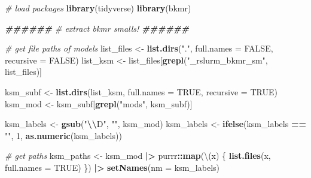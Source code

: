 \documentclass[12pt, twoside]{amherstthesis}
\newenvironment{Shaded}{\begin{snugshade}}{\end{snugshade}}
\newcommand{\AttributeTok}[1]{\textcolor[rgb]{0.13,0.29,0.53}{#1}}
\newcommand{\CommentTok}[1]{\textcolor[rgb]{0.56,0.35,0.01}{\textit{#1}}}
\newcommand{\ConstantTok}[1]{\textcolor[rgb]{0.56,0.35,0.01}{#1}}
\newcommand{\DecValTok}[1]{\textcolor[rgb]{0.00,0.00,0.81}{#1}}
\newcommand{\DocumentationTok}[1]{\textcolor[rgb]{0.56,0.35,0.01}{\textbf{\textit{#1}}}}
\newcommand{\FunctionTok}[1]{\textcolor[rgb]{0.13,0.29,0.53}{\textbf{#1}}}
\newcommand{\NormalTok}[1]{#1}
\newcommand{\OtherTok}[1]{\textcolor[rgb]{0.56,0.35,0.01}{#1}}
\newcommand{\SpecialCharTok}[1]{\textcolor[rgb]{0.81,0.36,0.00}{\textbf{#1}}}
\newcommand{\StringTok}[1]{\textcolor[rgb]{0.31,0.60,0.02}{#1}}
\begin{document}
\scriptsize
\begin{Shaded}
\begin{Highlighting}[]
\CommentTok{\# load packages}
\FunctionTok{library}\NormalTok{(tidyverse)}
\FunctionTok{library}\NormalTok{(bkmr)}

\DocumentationTok{\#\#\#\#\#\#}
\CommentTok{\# extract bkmr smalls!}
\DocumentationTok{\#\#\#\#\#\#}

\CommentTok{\# get file paths of models}
\NormalTok{list\_files }\OtherTok{\textless{}{-}} \FunctionTok{list.dirs}\NormalTok{(}\StringTok{"."}\NormalTok{, }\AttributeTok{full.names =} \ConstantTok{FALSE}\NormalTok{, }\AttributeTok{recursive =} \ConstantTok{FALSE}\NormalTok{)}
\NormalTok{list\_ksm }\OtherTok{\textless{}{-}}\NormalTok{ list\_files[}\FunctionTok{grepl}\NormalTok{(}\StringTok{"\_rslurm\_bkmr\_sm"}\NormalTok{, list\_files)]}

\NormalTok{ksm\_subf }\OtherTok{\textless{}{-}} \FunctionTok{list.dirs}\NormalTok{(list\_ksm, }\AttributeTok{full.names =} \ConstantTok{TRUE}\NormalTok{, }\AttributeTok{recursive =} \ConstantTok{TRUE}\NormalTok{)}
\NormalTok{ksm\_mod }\OtherTok{\textless{}{-}}\NormalTok{ ksm\_subf[}\FunctionTok{grepl}\NormalTok{(}\StringTok{"mods"}\NormalTok{, ksm\_subf)]}

\NormalTok{ksm\_labels }\OtherTok{\textless{}{-}} \FunctionTok{gsub}\NormalTok{(}\StringTok{"}\SpecialCharTok{\textbackslash{}\textbackslash{}}\StringTok{D"}\NormalTok{, }\StringTok{""}\NormalTok{, ksm\_mod)}
\NormalTok{ksm\_labels }\OtherTok{\textless{}{-}} \FunctionTok{ifelse}\NormalTok{(ksm\_labels }\SpecialCharTok{==} \StringTok{""}\NormalTok{, }\DecValTok{1}\NormalTok{, }\FunctionTok{as.numeric}\NormalTok{(ksm\_labels))}

\CommentTok{\# get paths}
\NormalTok{ksm\_paths }\OtherTok{\textless{}{-}}\NormalTok{ ksm\_mod }\SpecialCharTok{|\textgreater{}} 
\NormalTok{  purrr}\SpecialCharTok{::}\FunctionTok{map}\NormalTok{(\textbackslash{}(x) \{}
    \FunctionTok{list.files}\NormalTok{(x, }\AttributeTok{full.names =} \ConstantTok{TRUE}\NormalTok{)}
\NormalTok{  \}) }\SpecialCharTok{|\textgreater{}} 
  \FunctionTok{setNames}\NormalTok{(}\AttributeTok{nm =}\NormalTok{ ksm\_labels)}


\end{Highlighting}
\end{Shaded}
\end{document}

